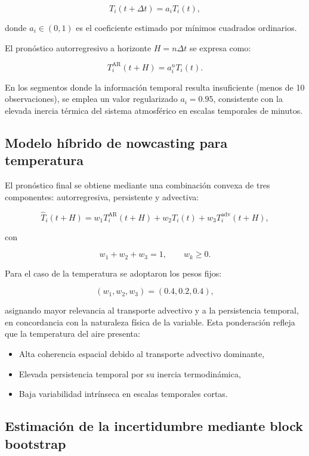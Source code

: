 \documentclass[
  spanish,
  us-letterpaper,
]{scrreprt}
\providecommand{\tightlist}{%
  \setlength{\itemsep}{0pt}\setlength{\parskip}{0pt}}
\numberwithin{equation}{section}
\begin{document}
\[
T_i(t+\Delta t) = a_i T_i(t),
\]

donde \(a_i \in (0,1)\) es el coeficiente estimado por mínimos cuadrados
ordinarios.

El pronóstico autorregresivo a horizonte \(H = n\Delta t\) se expresa
como:

\[
T_i^{\text{AR}}(t+H) = a_i^{n} T_i(t).
\]

En los segmentos donde la información temporal resulta insuficiente
(menos de 10 observaciones), se emplea un valor regularizado
\(a_i = 0.95\), consistente con la elevada inercia térmica del sistema
atmosférico en escalas temporales de minutos.

\subsection{Modelo híbrido de nowcasting para
temperatura}\label{modelo-huxedbrido-de-nowcasting-para-temperatura}

El pronóstico final se obtiene mediante una combinación convexa de tres
componentes: autorregresiva, persistente y advectiva:

\[
\hat{T}_i(t+H) = w_1 T_i^{\text{AR}}(t+H) + w_2 T_i(t) + w_3 T_i^{\text{adv}}(t+H),
\]

con

\[
w_1 + w_2 + w_3 = 1, \qquad w_k \ge 0.
\]

Para el caso de la temperatura se adoptaron los pesos fijos:

\[
(w_1, w_2, w_3) = (0.4, 0.2, 0.4),
\]

asignando mayor relevancia al transporte advectivo y a la persistencia
temporal, en concordancia con la naturaleza física de la variable. Esta
ponderación refleja que la temperatura del aire presenta:

\begin{itemize}
\tightlist
\item
  Alta coherencia espacial debido al transporte advectivo dominante,
\item
  Elevada persistencia temporal por su inercia termodinámica,
\item
  Baja variabilidad intrínseca en escalas temporales cortas.
\end{itemize}

\subsection{Estimación de la incertidumbre mediante block
bootstrap}\label{estimaciuxf3n-de-la-incertidumbre-mediante-block-bootstrap}
\end{document}
